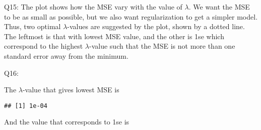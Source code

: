 \documentclass[]{article}
\newenvironment{Shaded}{\begin{snugshade}}{\end{snugshade}}
\newcommand{\KeywordTok}[1]{\textcolor[rgb]{0.13,0.29,0.53}{\textbf{#1}}}
\newcommand{\DataTypeTok}[1]{\textcolor[rgb]{0.13,0.29,0.53}{#1}}
\newcommand{\DecValTok}[1]{\textcolor[rgb]{0.00,0.00,0.81}{#1}}
\newcommand{\FloatTok}[1]{\textcolor[rgb]{0.00,0.00,0.81}{#1}}
\newcommand{\StringTok}[1]{\textcolor[rgb]{0.31,0.60,0.02}{#1}}
\newcommand{\CommentTok}[1]{\textcolor[rgb]{0.56,0.35,0.01}{\textit{#1}}}
\newcommand{\OtherTok}[1]{\textcolor[rgb]{0.56,0.35,0.01}{#1}}
\newcommand{\OperatorTok}[1]{\textcolor[rgb]{0.81,0.36,0.00}{\textbf{#1}}}
\newcommand{\NormalTok}[1]{#1}
\begin{document}
Q15: The plot shows how the MSE vary with the value of \(\lambda\). We
want the MSE to be as small as possible, but we also want regularization
to get a simpler model. Thus, two optimal \(\lambda\)-values are
suggested by the plot, shown by a dotted line. The leftmost is that with
lowest MSE value, and the other is 1se which correspond to the highest
\(\lambda\)-value such that the MSE is not more than one standard error
away from the minimum.

Q16:

\begin{Shaded}
\end{Shaded}

The \(\lambda\)-value that gives lowest MSE is

\begin{Shaded}
\end{Shaded}

\begin{verbatim}
## [1] 1e-04
\end{verbatim}

And the value that corresponds to 1se is

\begin{Shaded}
\end{Shaded}
\end{document}
